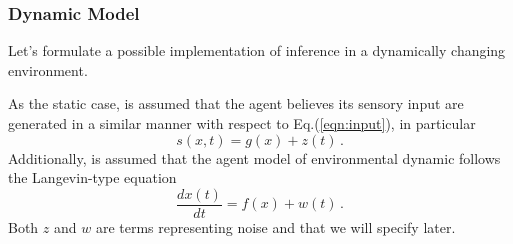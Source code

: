 \documentclass[a4paper, 10pt]{article}
\begin{document}
\subsubsection{Dynamic Model}
Let's formulate a possible implementation of inference in a dynamically changing environment.

As the static case, is assumed that the agent believes its sensory input are generated in a similar manner with respect to Eq.(\ref{eqn:input}), in particular
\begin{equation}
s(x,t) = g(x) + z(t) \, .
\label{eqn:s}
\end{equation}
Additionally, is assumed that the agent model of environmental dynamic follows the Langevin-type equation
\begin{equation}
\frac{d x(t)}{dt} = f(x) + w(t) \, .
\label{eqn:x}
\end{equation}
Both $z$ and $w$ are terms representing noise and that we will specify later.
\end{document}
